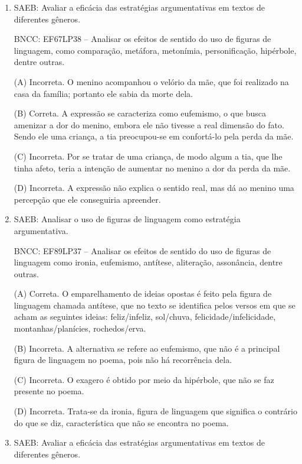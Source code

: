 \begin{enumerate}
\item

SAEB: Avaliar a eficácia das estratégias argumentativas em textos de
diferentes gêneros. 

BNCC: EF67LP38 -- Analisar os efeitos de sentido do
uso de figuras de linguagem, como comparação, metáfora, metonímia,
personificação, hipérbole, dentre outras.

(A) Incorreta. O menino acompanhou o velório da mãe, que foi realizado
na casa da família; portanto ele sabia da morte dela. 

(B) Correta. A
expressão se caracteriza como eufemismo, o que busca amenizar a dor do
menino, embora ele não tivesse a real dimensão do fato. Sendo ele uma
criança, a tia preocupou-se em confortá-lo pela perda da mãe. 

(C)
Incorreta. Por se tratar de uma criança, de modo algum a tia, que lhe
tinha afeto, teria a intenção de aumentar no menino a dor da perda da
mãe. 

(D) Incorreta. A expressão não explica o sentido real, mas dá ao
menino uma percepção que ele conseguiria apreender.

\item
SAEB: Analisar o uso de figuras de linguagem como estratégia
argumentativa.

BNCC: EF89LP37 -- Analisar os efeitos de sentido do uso
de figuras de linguagem como ironia, eufemismo, antítese, aliteração,
assonância, dentre outras.

(A) Correta. O emparelhamento de ideias opostas é feito pela figura de
linguagem chamada antítese, que no texto se identifica pelos versos em
que se acham as seguintes ideias: feliz/infeliz, sol/chuva,
felicidade/infelicidade, montanhas/planícies, rochedos/erva. 

(B)
Incorreta. A alternativa se refere ao eufemismo, que não é a principal
figura de linguagem no poema, pois não há recorrência dela. 

(C)
Incorreta. O exagero é obtido por meio da hipérbole, que não se faz
presente no poema. 

(D) Incorreta. Trata-se da ironia, figura de
linguagem que significa o contrário do que se diz, característica que
não se encontra no poema.

\item

SAEB: Avaliar a eficácia das estratégias argumentativas em textos de
diferentes gêneros.


\end{enumerate}
